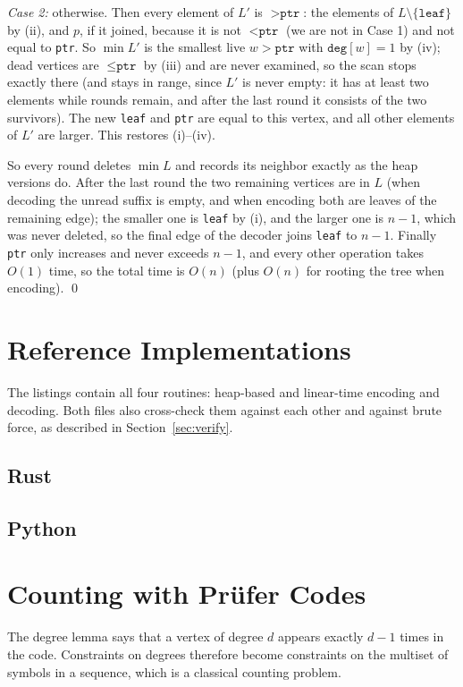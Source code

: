 \documentclass[11pt]{article}
\begin{document}
\begin{theorembox}
\emph{Case 2:} otherwise. Then every element of $L'$ is $>\texttt{ptr}$:
the elements of $L\setminus\{\texttt{leaf}\}$ by (ii), and $p$, if it
joined, because it is not $<\texttt{ptr}$ (we are not in Case 1) and not
equal to \texttt{ptr}. So $\min L'$ is the smallest live
$w>\texttt{ptr}$ with $\texttt{deg}[w]=1$ by (iv); dead vertices are
$\le\texttt{ptr}$ by (iii) and are never examined, so the scan stops
exactly there (and stays in range, since $L'$ is never empty: it has at least two
elements while rounds remain, and after the last round it consists of the
two survivors). The new \texttt{leaf} and \texttt{ptr} are equal to this vertex,
and all other elements of $L'$ are larger. This restores
(i)--(iv).

So every round deletes $\min L$ and records its neighbor exactly as the
heap versions do. After the last round the two remaining vertices are
in $L$ (when decoding the unread suffix is empty, and when encoding both
are leaves of the remaining edge); the smaller one is \texttt{leaf} by (i),
and the larger one is $n-1$, which was never deleted, so the final edge of
the decoder joins \texttt{leaf} to $n-1$. Finally \texttt{ptr} only increases and never exceeds
$n-1$, and every other operation takes $O(1)$ time, so the total time is
$O(n)$ (plus $O(n)$ for rooting the tree when encoding). \qed
\end{theorembox}

\section{Reference Implementations}
The listings contain all four routines: heap-based and linear-time
encoding and decoding. Both files also cross-check them against each other
and against brute force, as described in
Section~\ref{sec:verify}.

\codenote
\subsection{Rust}

\subsection{Python}

\section{Counting with Prüfer Codes}
The degree lemma says that a vertex of degree $d$ appears exactly $d-1$
times in the code. Constraints on degrees therefore become constraints on
the multiset of symbols in a sequence, which is a classical counting
problem.
\end{document}
